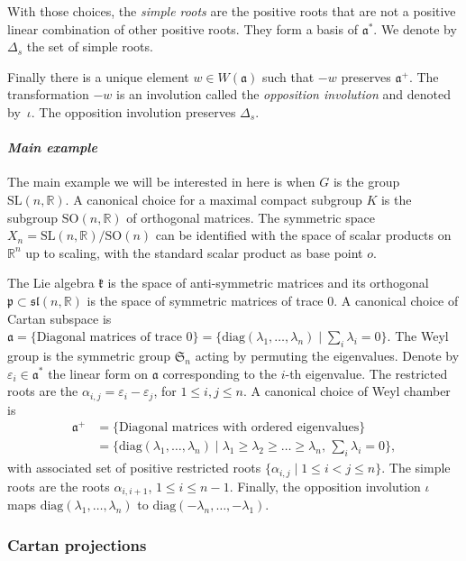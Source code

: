 \documentclass[11pt]{article}
\numberwithin{equation}{section}
\theoremstyle{definition}
\newcommand{\R}{\mathbb{R}}
\newcommand{\diag}{\mathrm{diag}}
\newcommand{\SL}{\mathrm{SL}}
\newcommand{\SO}{\mathrm{SO}}
\newcommand{\fa}{\mathfrak{a}}
\newcommand{\fp}{\mathfrak{p}}
\newcommand{\fk}{\mathfrak{k}}
\let\epsilon\varepsilon
\let\op\iota
\begin{document}
With those choices, the \emph{simple roots} are the positive roots that are not a positive linear combination of other positive roots. They form a basis of $\fa^*$. We denote by $\Delta_s$ the set of simple roots.

Finally there is a unique element $w\in W(\fa)$ such that $-w$ preserves $\fa^+$. The transformation $-w$ is an involution called the \emph{opposition involution} and denoted by~$\op$. The opposition involution preserves $\Delta_s$.

\paragraph{\textit{Main example}} The main example we will be interested in here is when $G$ is the group $\SL(n,\R)$. A canonical choice for a maximal compact subgroup $K$ is the subgroup $\SO(n,\R)$ of orthogonal matrices. The symmetric space $X_n = \SL(n,\R)/\SO(n)$ can be identified with the space of scalar products on $\R^n$ up to scaling, with the standard scalar product as base point $o$.

The Lie algebra $\fk$ is the space of anti-symmetric matrices and its orthogonal $\fp \subset \mathfrak{sl}(n,\R)$ is the space of symmetric matrices of trace $0$. A canonical choice of Cartan subspace is $\fa= \{\textrm{Diagonal matrices of trace $0$}\}= \{ \diag(\lambda_1, \dots , \lambda_n)\mid \sum_i \lambda_i=0\} $. The Weyl group is the symmetric group $\mathfrak{S}_n$ acting by permuting the eigenvalues. Denote by $\epsilon_i\in \fa^*$ the linear form on $\fa$ corresponding to the $i$-th eigenvalue. The restricted roots are the $\alpha_{i,j}=\epsilon_i - \epsilon_j$, for $1\leq i, j \leq n$. A canonical choice of Weyl chamber is
\begin{align*}
\fa^+ &=\{\textrm{Diagonal matrices with ordered eigenvalues}\}\\
&=\{ \diag(\lambda_1, \dots , \lambda_n)\mid \lambda_1 \geq \lambda_2\geq \ldots \geq \lambda_n, \, \sum_i \lambda_i=0\},
\end{align*}
with associated set of positive restricted roots $\{\alpha_{i,j}\mid 1\leq i < j \leq n\}$. The simple roots are the roots $\alpha_{i,i+1}$, $1\leq i \leq n-1$. Finally, the opposition involution $\op$ maps $\diag(\lambda_1,\ldots, \lambda_n)$ to $\diag(-\lambda_n,\ldots, -\lambda_1)$.

\subsubsection{Cartan projections}
\end{document}
